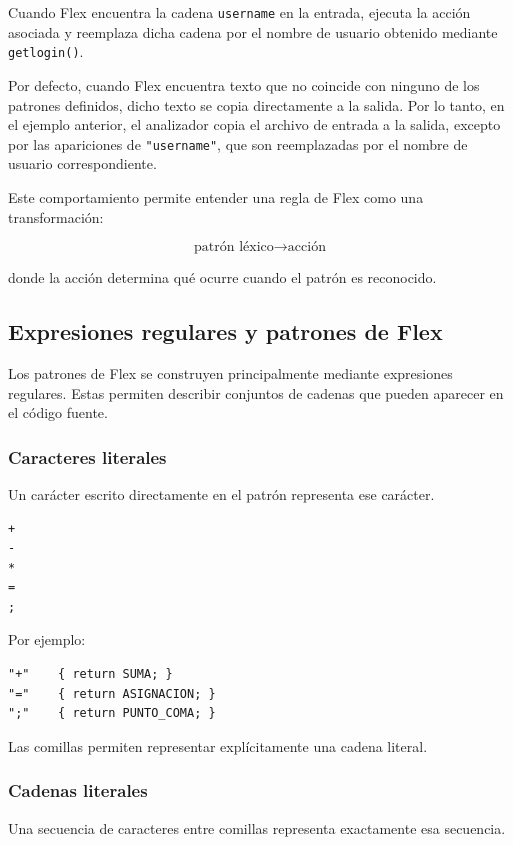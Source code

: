 \documentclass{article}
\begin{document}
Cuando Flex encuentra la cadena \texttt{username} en la entrada, ejecuta
la acción asociada y reemplaza dicha cadena por el nombre de usuario
obtenido mediante \texttt{getlogin()}.

Por defecto, cuando Flex encuentra texto que no coincide con ninguno de
los patrones definidos, dicho texto se copia directamente a la salida.
Por lo tanto, en el ejemplo anterior, el analizador copia el archivo de
entrada a la salida, excepto por las apariciones de \texttt{"username"},
que son reemplazadas por el nombre de usuario correspondiente.

Este comportamiento permite entender una regla de Flex como una
transformación:

\[
\text{patrón léxico}
\longrightarrow
\text{acción}
\]

donde la acción determina qué ocurre cuando el patrón es reconocido.

\subsection{Expresiones regulares y patrones de Flex}

Los patrones de Flex se construyen principalmente mediante expresiones
regulares. Estas permiten describir conjuntos de cadenas que pueden
aparecer en el código fuente.

\subsubsection{Caracteres literales}

Un carácter escrito directamente en el patrón representa ese carácter.

\begin{verbatim}
+
-
*
=
;
\end{verbatim}

Por ejemplo:

\begin{verbatim}
"+"    { return SUMA; }
"="    { return ASIGNACION; }
";"    { return PUNTO_COMA; }
\end{verbatim}

Las comillas permiten representar explícitamente una cadena literal.

\subsubsection{Cadenas literales}

Una secuencia de caracteres entre comillas representa exactamente esa
secuencia.
\end{document}

